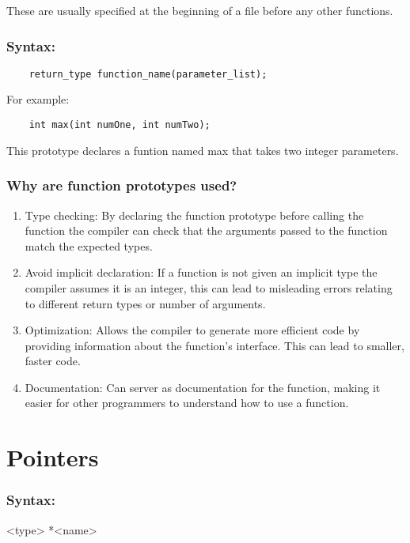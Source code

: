 \documentclass[12pt, letterpaper]{report}
\begin{document}
These are usually specified at the beginning of a file before any other functions.

\subsection*{Syntax:}
\begin{lstlisting}
	return_type function_name(parameter_list);
\end{lstlisting}

For example:
\begin{lstlisting}
	int max(int numOne, int numTwo);
\end{lstlisting}
This prototype declares a funtion named max that takes two integer parameters.

\subsection{Why are function prototypes used?}

\begin{enumerate}
	\item Type checking: By declaring the function prototype before calling the 
		function the compiler can check that the arguments passed to the function 
		match the expected types.
	\item Avoid implicit declaration: If a function is not given an implicit type 
		the compiler assumes it is an integer, this can lead to misleading errors 
		relating to different return types or number of arguments.
	\item Optimization: Allows the compiler to generate more efficient code by
		providing information about the function's interface. This can lead to
		smaller, faster code.
	\item Documentation: Can server as documentation for the function, making
		it easier for other programmers to understand how to use a function.
\end{enumerate}

\chapter{Pointers}

	\subsection*{Syntax:}
	<type> *<name>

\vspace{0.25cm}
\end{document}
